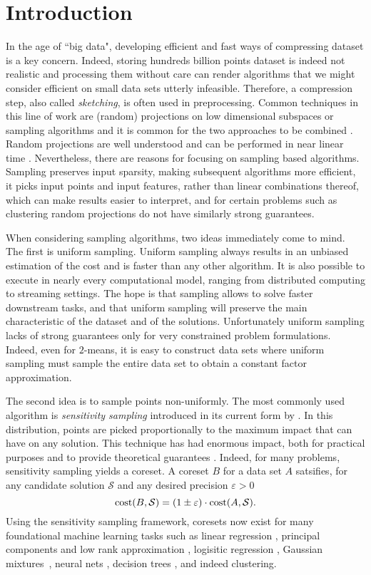 \section{Introduction}

In the age of ``big data", developing efficient and fast ways of compressing dataset is a key concern. Indeed, storing hundreds billion points dataset is indeed not realistic and processing them without care can render algorithms that we might consider efficient on small data sets utterly infeasible. 
Therefore, a compression step, also called \textit{sketching}, is often used in preprocessing. Common techniques in this line of work are (random) projections on low dimensional subspaces or sampling algorithms and it is common for the two approaches to be combined \cite{ClarksonDMMMW16, CohenEMMP15, MahoneyDMW12}. 
Random projections are well understood and can be performed in near linear time \cite{AilonC09,ClarksonW13,NelsonN13}.
Nevertheless, there are reasons for focusing on sampling based algorithms. Sampling preserves input sparsity, making subsequent algorithms more efficient, it picks input points and input features, rather than linear combinations thereof, which can make results easier to interpret, and for certain problems such as clustering random projections do not have similarly strong guarantees.

When considering sampling algorithms, two ideas immediately come to mind. The first is uniform sampling. Uniform sampling always results in an unbiased estimation of the cost and is faster than any other algorithm. 
It is also possible to execute in nearly every computational model, ranging from distributed computing to streaming settings.
The hope is that sampling allows to solve faster downstream tasks, and that uniform sampling will preserve the main characteristic of the dataset and of the solutions.
Unfortunately uniform sampling lacks of strong guarantees only for very constrained problem formulations. Indeed, even for $2$-means, it is easy to construct data sets where uniform sampling must sample the entire data set to obtain a constant factor approximation.

The second idea is to sample points non-uniformly. 
The most commonly used algorithm is \textit{sensitivity sampling} introduced in its current form by \cite{LS10}. In this distribution, points are picked proportionally to the maximum impact that can have on any solution. 
This technique has had enormous impact, both for practical purposes and to provide theoretical guarantees \cite{FeldmanL11, CohenP15,RajMM20}. Indeed, for many problems, sensitivity sampling yields a coreset. A coreset $B$ for a data set $A$ satsifies, for any candidate solution $\mathcal{S}$ and any desired precision $\varepsilon>0$
$$\operatorname{cost}(B,\mathcal{S}) = (1\pm \varepsilon)\cdot \operatorname{cost}(A,\mathcal{S}).$$
Using the sensitivity sampling framework, coresets now exist for many foundational machine learning tasks such as linear regression \cite{BoutsidisDM13,CohenLMMPS15,HuangSV20,TukanMF20}, principal components and low rank approximation \cite{CohenEMMP15,maalouf2019fast}, logisitic regression \cite{HugginsCB16,MunteanuSSW18}, Gaussian mixtures~\cite{LucicFKF17}, neural nets \cite{BaykalLGFR19}, decision trees \cite{JSNF21}, and indeed clustering.

